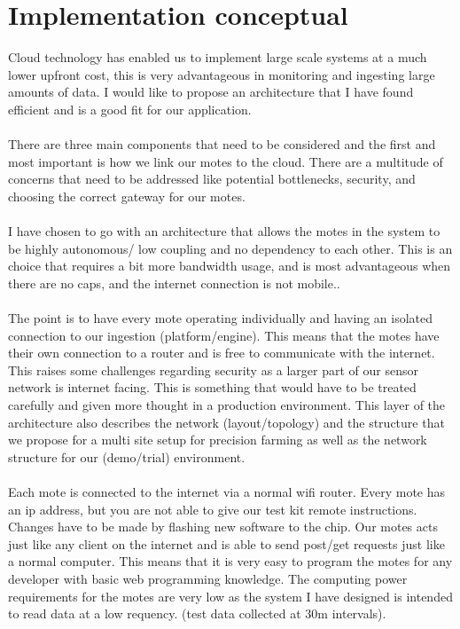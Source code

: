 \documentclass[]{uiophd}
\begin{document}
\section{Implementation conceptual}
Cloud technology has enabled us to implement large scale systems at a much lower upfront cost, this is very advantageous in monitoring and ingesting large amounts of data. I would like to propose an architecture that I have found efficient and is a good fit for our application. 
\\\\
There are three main components that need to be considered and the first and most important is how we link our motes to the cloud. There are a multitude of concerns that need to be addressed like potential bottlenecks, security, and choosing the correct gateway for our motes.
\\\\
I have chosen to go with an architecture that allows the motes in the system to be highly autonomous/ low coupling and no dependency to each other. This is an choice that requires a bit more bandwidth usage, and is most advantageous when there are no caps, and the internet connection is not mobile..
\\\\
The point is to have every mote operating individually and having an isolated connection to our ingestion (platform/engine). This means that the motes have their own connection to a router and is free to communicate with the internet. This raises some challenges regarding security as a larger part of our sensor network is internet facing. This is something that would have to be treated carefully and given more thought in a production environment. This layer of the architecture also describes the network (layout/topology) and the structure that we propose for a multi site setup for precision farming as well as the network structure for our (demo/trial) environment.
\\\\
Each mote is connected to the internet via a normal wifi router. Every mote has an ip address, but you are not able to give our test kit remote instructions. Changes have to be made by flashing new software to the chip. Our motes acts just like any client on the internet and is able to send post/get requests just like a normal computer. This means that it is very easy to program the motes for any developer with basic web programming knowledge. The computing power requirements for the motes are very low as the system I have designed is intended to read data at a low requency. (test data collected at 30m intervals).
\end{document}
